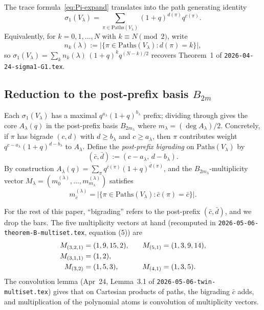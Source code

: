 \documentclass[11pt]{article}
\theoremstyle{definition}
\begin{document}
The trace formula~\eqref{eq:Pi-expand} translates into the path generating identity
\begin{equation}\label{eq:sigma1-paths}
\sigma_1(V_\lambda) = \sum_{\pi \in \mathrm{Paths}(V_\lambda)} (1+q)^{d(\pi)} q^{c(\pi)}.
\end{equation}
Equivalently, for $k = 0, 1, \ldots, N$ with $k \equiv N \pmod 2$, write
\[
n_k(\lambda) := \bigl|\{\pi \in \mathrm{Paths}(V_\lambda) : d(\pi) = k\}\bigr|,
\]
so $\sigma_1(V_\lambda) = \sum_k n_k(\lambda) \, (1+q)^k q^{(N-k)/2}$ recovers Theorem~1 of \texttt{2026-04-24-sigma1-G1.tex}.

\subsection*{Reduction to the post-prefix basis $B_{2m}$}

Each $\sigma_1(V_\lambda)$ has a maximal $q^{a_\lambda}(1+q)^{b_\lambda}$ prefix; dividing through gives the core $A_\lambda(q)$ in the post-prefix basis $B_{2m_\lambda}$ where $m_\lambda = (\deg A_\lambda)/2$. Concretely, if $\pi$ has bigrade $(c, d)$ with $d \geq b_\lambda$ and $c \geq a_\lambda$, then $\pi$ contributes weight $q^{c - a_\lambda}(1+q)^{d - b_\lambda}$ to $A_\lambda$. Define the \emph{post-prefix bigrading} on $\mathrm{Paths}(V_\lambda)$ by
\[
(\bar c, \bar d) := (c - a_\lambda, \, d - b_\lambda).
\]
By construction $A_\lambda(q) = \sum_{\pi} q^{\bar c(\pi)} (1+q)^{\bar d(\pi)}$, and the $B_{2m_\lambda}$-multiplicity vector $M_\lambda = (m_0^{(\lambda)}, \ldots, m_{m_\lambda}^{(\lambda)})$ satisfies
\[
m_{\bar c}^{(\lambda)} = \bigl|\{\pi \in \mathrm{Paths}(V_\lambda) : \bar c(\pi) = \bar c\}\bigr|.
\]

For the rest of this paper, ``bigrading'' refers to the post-prefix $(\bar c, \bar d)$, and we drop the bars. The five multiplicity vectors at hand (recomputed in \texttt{2026-05-06-theorem-B-multiset.tex}, equation (5)) are
\begin{align}\label{eq:five-vectors}
M_{(3,2,1)} &= (1,9,15,2), &\quad M_{(5,1)} &= (1,3,9,14), \notag\\
M_{(3,1,1)} &= (1,2),\notag\\
M_{(3,2)} &= (1,5,3), &\quad M_{(4,1)} &= (1,3,5).
\end{align}
The convolution lemma (Apr~24, Lemma~3.1 of \texttt{2026-05-06-twin-multiset.tex}) gives that on Cartesian products of paths, the bigrading $\bar c$ adds, and multiplication of the polynomial atoms is convolution of multiplicity vectors.
\end{document}
